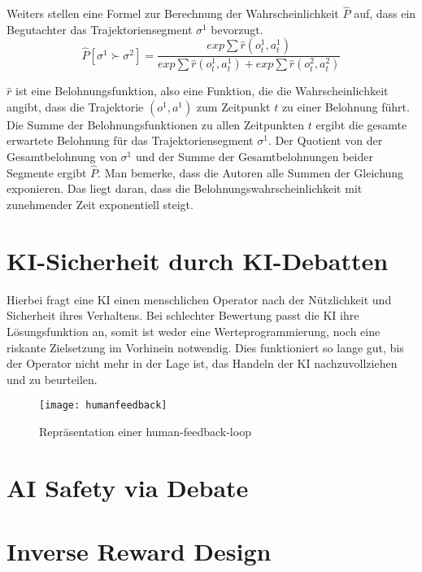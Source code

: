 Weiters stellen \citeauthor{christiano_deep_2017} eine Formel zur Berechnung der Wahrscheinlichkeit $\hat{P}$ auf, dass ein Begutachter das Trajektoriensegment $\sigma^1$ bevorzugt.
\begin{equation}
  \hat{P}[\sigma^1 \succ \sigma^2] = \frac{exp \sum \hat{r} (o_t^1,a_t^1)}{exp \sum \hat{r}(o^1_t,a^1_t) + exp \sum \hat{r}(o^2_t, a^2_t)}
\end{equation}

$\hat{r}$ ist eine Belohnungsfunktion, also eine Funktion, die die Wahrscheinlichkeit angibt, dass die Trajektorie $(o^1,a^1)$ zum Zeitpunkt $t$ zu einer Belohnung führt. Die Summe der Belohnungsfunktionen zu allen Zeitpunkten $t$ ergibt die gesamte erwartete Belohnung für das Trajektoriensegment $\sigma^1$. Der Quotient von der Gesamtbelohnung von $\sigma^1$ und der Summe der Gesamtbelohnungen beider Segmente ergibt $\hat{P}$. Man bemerke, dass die Autoren alle Summen der Gleichung exponieren. Das liegt daran, dass die Belohnungswahrscheinlichkeit mit zunehmender Zeit exponentiell steigt.

\section{KI-Sicherheit durch KI-Debatten}

Hierbei fragt eine KI einen menschlichen Operator nach der Nützlichkeit und Sicherheit ihres Verhaltens. Bei schlechter Bewertung passt die KI ihre Lösungsfunktion an, somit ist weder eine Werteprogrammierung, noch eine riskante Zielsetzung im Vorhinein notwendig.  Dies funktioniert so lange gut, bis der Operator nicht mehr in der Lage ist, das Handeln der KI nachzuvollziehen und zu beurteilen. 

\begin{figure}
  \texttt{[image: humanfeedback]}
  \caption{Repräsentation einer human-feedback-loop}
  \label{humanfeedbackimg}
\end{figure}

\section{AI Safety via Debate}
\section{Inverse Reward Design}



